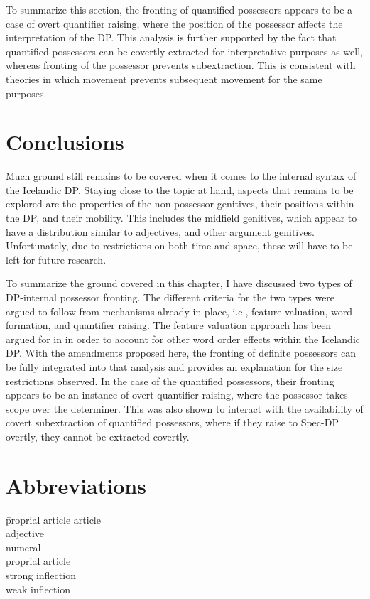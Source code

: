 \documentclass[output=paper]{langscibook}
\begin{document}
To summarize this section, the fronting of quantified possessors appears to be a case of overt quantifier raising, where the position of the possessor affects the interpretation of the DP. This analysis is further supported by the fact that quantified possessors can be covertly extracted for interpretative purposes as well, whereas fronting of the possessor prevents subextraction. This is consistent with theories in which movement prevents subsequent movement for the same purposes.




\section{Conclusions}\label{sec:hardarson:4}

Much ground still remains to be covered when it comes to the internal syntax of the Icelandic DP. Staying close to the topic at hand, aspects that remains to be explored are the properties of the non-possessor genitives, their positions within the DP, and their mobility. This includes the midfield genitives, which appear to have a distribution similar to adjectives, and other argument genitives. Unfortunately, due to restrictions on both time and space, these will have to be left for future research.

To summarize the ground covered in this chapter, I have discussed two types of DP-internal possessor fronting. The different criteria for the two types were argued to follow from mechanisms already in place, i.e., feature valuation, word formation, and quantifier raising. The feature valuation approach has been argued for in \citet{Hardarson:2016wd} in order to account for other word order effects within the Icelandic DP. With the amendments proposed here, the fronting of definite possessors can be fully integrated into that analysis and provides an explanation for the size restrictions observed. In the case of the quantified possessors, their fronting appears to be an instance of overt quantifier raising, where the possessor takes scope over the determiner. This was also shown to interact with the availability of covert subextraction of quantified possessors, where if they raise to Spec-DP overtly, they cannot be extracted covertly.




\section*{Abbreviations}
\begin{multicols}{3}
\begin{tabbing}
\hardProp\hspace{1ex}\= proprial article \kill
\hardArt \> article \\
\hardAdj \> adjective \\
\hardNum \> numeral   \\
\hardProp \> proprial article \\
\hardStr \> strong inflection \\
\hardWk \> weak inflection
\end{tabbing}
\end{multicols}
\end{document}
